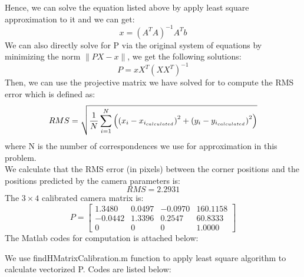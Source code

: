 \documentclass[letterpaper]{article}
\begin{document}
Hence, we can solve the equation listed above by apply least square approximation to it and we can get:
$$x = (A^TA)^{-1}A^Tb$$
We can also directly solve for P via the original system of equations by minimizing the norm $\|PX - x\|$, we get the following solutions:
$$P = xX^T(XX^T)^{-1}$$
Then, we can use the projective matrix we have solved for to compute the RMS error which is defined as:
$$RMS = \sqrt{\frac{\displaystyle 1}{\displaystyle N}\sum_{i=1}^{N}\left(\left(x_i - x_{i_{calculated}}\right)^2 + \left(y_i - y_{i_{calculated}}\right)^2\right)}$$
where N is the number of correspondences we use for approximation in this problem.\\
We calculate that the RMS error (in pixels) between the corner positions and the positions predicted by the camera parameters is:
$$RMS = 2.2931$$
The $3\times 4$ calibrated camera matrix is:
$$P = 
\begin{bmatrix}
1.3480 & 0.0497 & -0.0970 & 160.1158\\
-0.0442 & 1.3396 & 0.2547 & 60.8333\\
0 & 0 & 0 & 1.0000
\end{bmatrix}
$$
The Matlab codes for computation is attached below:

We use findHMatrixCalibration.m function to apply least square algorithm to calculate vectorized P. Codes are listed below:

\end{document}
